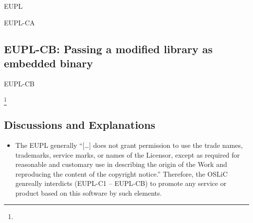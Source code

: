 \begin{license}{EUPL}
\begin{lsuc}{EUPL-CA}
\end{lsuc}

\subsection{EUPL-CB: Passing a modified library as embedded binary}
\begin{lsuc}{EUPL-CB}



  \begin{lsucrequires}
    \lsucmandatory{\keepLicensingElements \addWhenCompiling}
    \lsucmandatory{\giveLicense}\footnote{\passingFilesCorrectly}
    \lsucmandatory{\addModificationTextFile}
    \lsucmandatory{\makeAllSourcesAvailable}
    \lsucmandatory{\mentionRepositoryInDocumentation}
    \lsucmandatory{\arrangeBinaryModifications}
    \lsucmandatory{\applyCopyleftToBinaries}
    \lsucoptional{\markAllEmbeddedModifications}
    \lsucoptional{\addToYourCopyrightNotice}
  \end{lsucrequires}

  \begin{lsucprohibits}
    \lsucitem{\noTrademarks}
  \end{lsucprohibits}

\end{lsuc}

\subsection{Discussions and Explanations}
\begin{itemize}
  
\item The EUPL generally \enquote{[\ldots] does not grant permission to use
  the trade names, trademarks, service marks, or names of the Licensor, except
  as required for reasonable and customary use in describing the origin of the
  Work and reproducing the content of the copyright notice.} 
  Therefore, the OSLiC genreally interdicts (EUPL-C1 -- EUPL-CB) to promote any
  service or product based on this software by such elements. 


\end{itemize}
\end{license}
